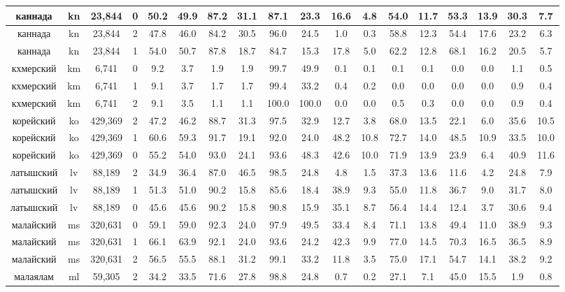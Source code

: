\begin{table*}
{\begin{tabular}{|c|c|c|c||c|c|c|c|c|c|c|c|c|c|c|c|c|c|}
каннада & kn & 23,844 & 0 & 50.2 & 49.9 & 87.2 & 31.1 & 87.1 & 23.3 & 16.6 & 4.8 & 54.0 & 11.7 & 53.3 & 13.9 & 30.3 & 7.7\\ \hline
каннада & kn & 23,844 & 2 & 47.8 & 46.0 & 84.2 & 30.5 & 96.0 & 24.5 & 1.0 & 0.3 & 58.8 & 12.3 & 54.4 & 17.6 & 23.2 & 6.3\\ \hline
каннада & kn & 23,844 & 1 & 54.0 & 50.7 & 87.8 & 18.7 & 84.7 & 15.3 & 17.8 & 5.0 & 62.2 & 12.8 & 68.1 & 16.2 & 20.5 & 5.7\\ \hline
кхмерский & km & 6,741 & 0 & 9.2 & 3.7 & 1.9 & 1.9 & 99.7 & 49.9 & 0.1 & 0.1 & 0.1 & 0.1 & 0.0 & 0.0 & 1.1 & 0.5\\ \hline
кхмерский & km & 6,741 & 1 & 9.1 & 3.7 & 1.7 & 1.7 & 99.4 & 33.2 & 0.4 & 0.2 & 0.0 & 0.0 & 0.0 & 0.0 & 0.9 & 0.4\\ \hline
кхмерский & km & 6,741 & 2 & 9.1 & 3.5 & 1.1 & 1.1 & 100.0 & 100.0 & 0.0 & 0.0 & 0.5 & 0.3 & 0.0 & 0.0 & 0.9 & 0.4\\ \hline
корейский & ko & 429,369 & 2 & 47.2 & 46.2 & 88.7 & 31.3 & 97.5 & 32.9 & 12.7 & 3.8 & 68.0 & 13.5 & 22.1 & 6.0 & 35.6 & 10.5\\ \hline
корейский & ko & 429,369 & 1 & 60.6 & 59.3 & 91.7 & 19.1 & 92.0 & 24.0 & 48.2 & 10.8 & 72.7 & 14.0 & 48.5 & 10.9 & 33.5 & 10.0\\ \hline
корейский & ko & 429,369 & 0 & 55.2 & 54.0 & 93.0 & 24.1 & 93.6 & 48.3 & 42.6 & 10.0 & 71.9 & 13.9 & 23.9 & 6.4 & 40.9 & 11.6\\ \hline
латышский & lv & 88,189 & 2 & 34.9 & 36.4 & 87.0 & 46.5 & 98.5 & 24.8 & 4.8 & 1.5 & 37.3 & 13.6 & 11.6 & 4.2 & 24.8 & 7.9\\ \hline
латышский & lv & 88,189 & 1 & 51.3 & 51.0 & 90.2 & 15.8 & 85.6 & 18.4 & 38.9 & 9.3 & 55.0 & 11.8 & 36.7 & 9.0 & 31.7 & 8.0\\ \hline
латышский & lv & 88,189 & 0 & 45.6 & 45.6 & 90.2 & 15.8 & 90.8 & 15.9 & 35.1 & 8.7 & 56.4 & 14.4 & 12.4 & 3.7 & 30.6 & 9.4\\ \hline
малайский & ms & 320,631 & 0 & 59.1 & 59.0 & 92.3 & 24.0 & 97.9 & 49.5 & 33.4 & 8.4 & 71.1 & 13.8 & 49.4 & 11.0 & 38.9 & 9.3\\ \hline
малайский & ms & 320,631 & 1 & 66.1 & 63.9 & 92.1 & 24.0 & 93.6 & 24.2 & 42.3 & 9.9 & 77.0 & 14.5 & 70.3 & 16.5 & 36.5 & 8.9\\ \hline
малайский & ms & 320,631 & 2 & 56.5 & 55.5 & 88.1 & 31.2 & 99.1 & 33.2 & 11.8 & 3.5 & 75.0 & 17.1 & 54.7 & 14.1 & 38.2 & 9.2\\ \hline
малаялам & ml & 59,305 & 2 & 34.2 & 33.5 & 71.6 & 27.8 & 98.8 & 24.8 & 0.7 & 0.2 & 27.1 & 7.1 & 45.0 & 15.5 & 1.9 & 0.8\\ \hline

\end{tabular}}
\end{table*}
